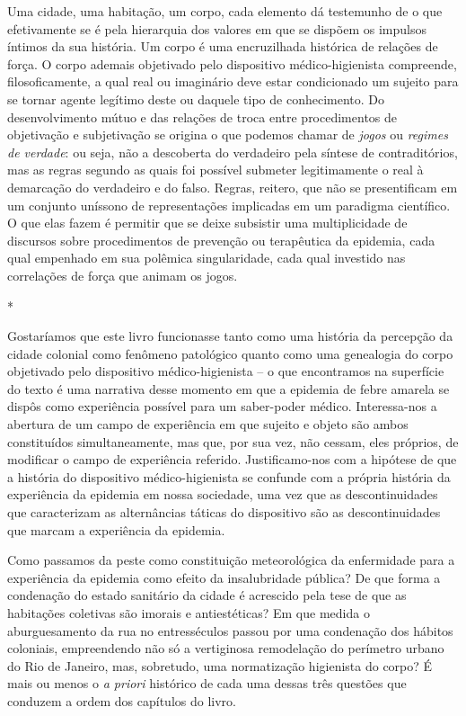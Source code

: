 Uma cidade, uma habitação, um corpo, cada elemento dá testemunho de o
que efetivamente se é pela hierarquia dos valores em que se dispõem os
impulsos íntimos da sua história. Um corpo é uma encruzilhada histórica
de relações de força. O corpo ademais objetivado pelo dispositivo
médico-higienista compreende, filosoficamente, a qual real ou imaginário
deve estar condicionado um sujeito para se tornar agente legítimo deste
ou daquele tipo de conhecimento. Do desenvolvimento mútuo e das relações
de troca entre procedimentos de objetivação e subjetivação se origina o
que podemos chamar de \emph{jogos} ou \emph{regimes de verdade}: ou
seja, não a descoberta do verdadeiro pela síntese de contraditórios, mas
as regras segundo as quais foi possível submeter legitimamente o real à
demarcação do verdadeiro e do falso. Regras, reitero, que não se
presentificam em um conjunto uníssono de representações implicadas em um
paradigma científico. O que elas fazem é permitir que se deixe subsistir
uma multiplicidade de discursos sobre procedimentos de prevenção ou
terapêutica da epidemia, cada qual empenhado em sua polêmica
singularidade, cada qual investido nas correlações de força que animam
os jogos.

*

Gostaríamos que este livro funcionasse tanto como uma história da
percepção da cidade colonial como fenômeno patológico quanto como uma
genealogia do corpo objetivado pelo dispositivo médico-higienista -- o
que encontramos na superfície do texto é uma narrativa desse momento em
que a epidemia de febre amarela se dispôs como experiência possível para
um saber-poder médico. Interessa-nos a abertura de um campo de
experiência em que sujeito e objeto são ambos constituídos
simultaneamente, mas que, por sua vez, não cessam, eles próprios, de
modificar o campo de experiência referido. Justificamo-nos com a
hipótese de que a história do dispositivo médico-higienista se confunde
com a própria história da experiência da epidemia em nossa sociedade,
uma vez que as descontinuidades que caracterizam as alternâncias táticas
do dispositivo são as descontinuidades que marcam a experiência da
epidemia.

Como passamos da peste como constituição meteorológica da enfermidade
para a experiência da epidemia como efeito da insalubridade pública? De
que forma a condenação do estado sanitário da cidade é acrescido pela
tese de que as habitações coletivas são imorais e antiestéticas? Em que
medida o aburguesamento da rua no entresséculos passou por uma
condenação dos hábitos coloniais, empreendendo não só a vertiginosa
remodelação do perímetro urbano do Rio de Janeiro, mas, sobretudo, uma
normatização higienista do corpo? É mais ou menos o \emph{a priori}
histórico de cada uma dessas três questões que conduzem a ordem dos
capítulos do livro.

